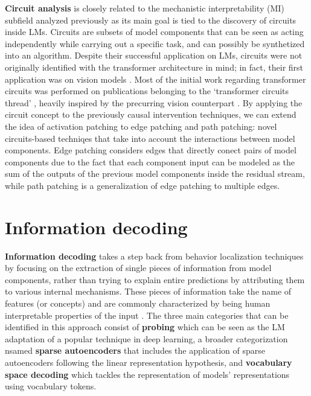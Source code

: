 \textbf{Circuit analysis} is closely related to the mechanistic interpretability (MI) subfield analyzed previously as its main goal is tied to the discovery of circuits inside LMs.
Circuits are subsets of model components that can be seen as acting independently while carrying out a specific task, and can possibly be synthetized into an algorithm.
Despite their successful application on LMs, circuits were not originally identified with the transformer architecture in mind; in fact, their first application was on vision models \cite{cammarata2020}.
Most of the initial work regarding transformer circuits was performed on publications belonging to the `transformer circuits thread' , heavily inspired by the precurring vision counterpart \cite{cammarata2020}.
By applying the circuit concept to the previously causal intervention techniques, we can extend the idea of activation patching to edge patching and path patching: novel circuits-based techniqes that take into account the interactions between model components.
Edge patching  considers edges that directly conect pairs of model components due to the fact that each component input can be modeled as the sum of the outputs of the previous model components inside the residual stream, while path patching  is a generalization of edge patching to multiple edges.


\section{Information decoding}

\textbf{Information decoding} takes a step back from behavior localization techniques by focusing on the extraction of single pieces of information from model components, rather than trying to explain entire predictions by attributing them to various internal mechanisms.
These pieces of information take the name of features (or concepts) and are commonly characterized by being human interpretable properties of the input \cite{kim2018}.
The three main categories that can be identified in this approach consist of \textbf{probing} which can be seen as the LM adaptation of a popular technique in deep learning, a broader categorization nsamed \textbf{sparse autoencoders} that includes the application of sparse autoencoders following the linear representation hypothesis, and \textbf{vocabulary space decoding} which tackles the representation of models' representations using vocabulary tokens.

